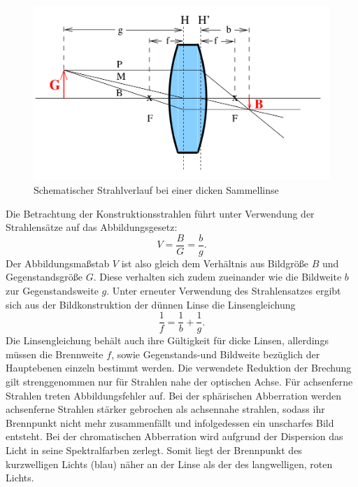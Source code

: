 \begin{figure}
  \includegraphics[width=\linewidth]{Bilder/fettelinse.png}
  \caption{Schematischer Strahlverlauf bei einer dicken Sammellinse \cite{Anleitung}}
  \label{fig:diefette}
\end{figure}
Die Betrachtung der Konstruktionsstrahlen führt unter Verwendung der Strahlensätze auf das Abbildungsgesetz:
\begin{equation}
  \label{eqn:abbi}
  V=\frac{B}{G}=\frac{b}{g} \text{.}
\end{equation}
Der Abbildungsmaßstab $V$ ist also gleich dem Verhältnis aus Bildgröße $B$ und Gegenstandsgröße $G$. Diese verhalten sich zudem zueinander wie die Bildweite $b$ zur Gegenstandsweite $g$.
Unter erneuter Verwendung des Strahlensatzes ergibt sich aus der Bildkonstruktion der dünnen Linse die Linsengleichung
\begin{equation}
  \label{eqn:linsi}
\frac{1}{f}=\frac{1}{b}+\frac{1}{g} \text{.}
\end{equation}
Die Linsengleichung behält auch ihre Gültigkeit für dicke Linsen, allerdings müssen die Brennweite $f$, sowie Gegenstands-und Bildweite bezüglich der Hauptebenen einzeln bestimmt werden.
Die verwendete Reduktion der Brechung gilt strenggenommen nur für Strahlen nahe der optischen Achse. Für achsenferne Strahlen treten Abbildungsfehler auf.
Bei der sphärischen Abberration werden achsenferne Strahlen stärker gebrochen als achsennahe strahlen, sodass ihr Brennpunkt nicht mehr zusammenfällt und infolgedessen ein unscharfes Bild entsteht.
Bei der chromatischen Abberration wird aufgrund der Dispersion das Licht in seine Spektralfarben zerlegt. Somit liegt der Brennpunkt des kurzwelligen Lichts (blau) näher an der Linse als der des langwelligen, roten Lichts.

